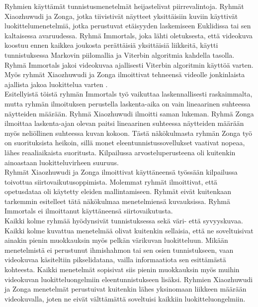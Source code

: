 Ryhmien käyttämät tunnistusmenetelmät heijastelivat piirrevalintoja. Ryhmät Xiaozhuwudi ja Zonga, jotka tiivistivät näytteet 
yksittäisiin kuviin käyttivät luokittelumenetelmiä, jotka perustuvat etäisyyden laskemiseen 
Euklidissa tai sen kaltaisessa avaruudessa. Ryhmä Immortals, joka lähti oletuksesta, että videokuva koostuu ennen kaikkea joukosta perättäisiä 
yksittäisiä liikkeitä, käytti tunnistuksessa Markovin piilomallia ja Viterbin algoritmia kahdella tasolla. Ryhmä Immortals jakoi videokuvaa 
ajallisesti Viterbin algoritmin käyttöä varten. Myös ryhmät Xiaozhuwudi ja Zonga ilmoittivat tehneensä videolle 
jonkinlaista ajallista jakoa luokittelua varten \citep{firstround}. \\

Esitellyistä töistä ryhmän Immortals työ vaikuttaa laskennallisesti raskaimmalta, mutta ryhmän ilmoituksen perustella laskenta-aika on vain lineaarinen suhteessa 
näytteiden määrään. Ryhmä Xiaozhuwudi ilmoitti saman lukeman. Ryhmä Zonga ilmoittaa laskenta-ajan olevan paitsi lineaarinen suhteessa näytteiden määrään myös
neliöllinen suhteessa kuvan kokoon. \citep{firstround} Tästä näkökulmasta ryhmän Zonga työ on suorituksista heikoin, sillä monet eleentunnistussovellukset vaativat 
nopeaa, lähes reaaliaikaista suoritusta. Kilpailussa arvosteluperusteena oli kuitenkin ainoastaan luokitteluvirheen suuruus.\\

Ryhmät Xiaozhuwudi ja Zonga ilmoittivat käyttäneensä työssään kilpailussa toivottua siirtovaikutusoppimista. Molemmat ryhmät ilmoittivat,
että opetusdataa oli käytetty eleiden mallintamiseen. Ryhmät eivät kuitenkaan tarkemmin esitelleet tätä näkökulmaa menetelmiensä kuvauksissa.
Ryhmä Immortals ei ilmoittanut käyttäneensä siirtovaikutusta. \citep{firstround}\\

Kaikki kolme ryhmää hyödynsivät tunnistuksessa sekä väri- että syvyyskuvaa. Kaikki kolme kuvattua menetelmää olivat kuitenkin sellaisia, 
että ne soveltuisivat ainakin pienin muokkauksin myös pelkän värikuvan luokitteluun. Mikään menetelmistä ei perustunut ihmishahmon 
tai sen osien tunnistukseen, vaan videokuvaa käsiteltiin pikselidatana, vailla informaatiota sen esittämästä kohteesta.
Kaikki menetelmät sopisivat siis  pienin muokkauksin myös muihin videokuvan luokitteluongelmiin eleentunnistukseen lisäksi. Ryhmien Xiaozhuwudi ja Zonga 
menetelmät perustuivat kuitenkin lähes yksinomaan liikkeen määrään videokuvalla, joten ne eivät välttämättä soveltuisi 
kaikkiin luokitteluongelmiin.\\

